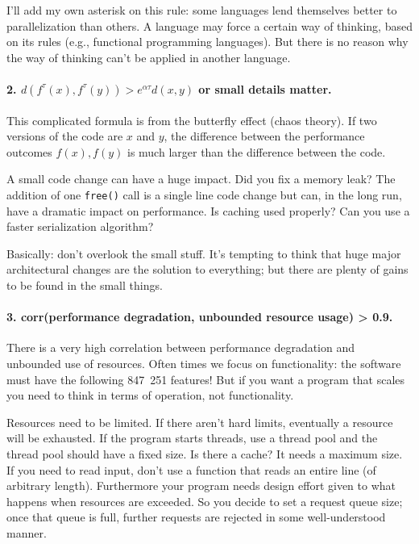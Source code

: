 I'll add my own asterisk on this rule: some languages lend themselves better to parallelization than others. A language may force a certain way of thinking, based on its rules (e.g., functional programming languages). But there is no reason why the way of thinking can't be applied in another language.


\paragraph{2. $d(f^{\tau}(x), f^{\tau}(y)) > e^{\alpha\tau} d(x, y)$ or small details matter.} This complicated formula is from the butterfly effect (chaos theory). If two versions of the code are $x$ and $y$, the difference between the performance outcomes $f(x), f(y)$ is much larger than the difference between the code.

A small code change can have a huge impact. Did you fix a memory leak? The addition of one \texttt{free()} call is a single line code change but can, in the long run, have a dramatic impact on performance. Is caching used properly? Can you use a faster serialization algorithm? 

Basically: don't overlook the small stuff. It's tempting to think that huge major architectural changes are the solution to everything; but there are plenty of gains to be found in the small things.

\paragraph{3. corr(performance degradation, unbounded resource usage) > 0.9.}
There is a very high correlation between performance degradation and unbounded use of resources. Often times we focus on functionality: the software must have the following 847~251 features! But if you want a program that scales you need to think in terms of operation, not functionality.

Resources need to be limited. If there aren't hard limits, eventually a resource will be exhausted. If the program starts threads, use a thread pool and the thread pool should have a fixed size. Is there a cache? It needs a maximum size. If you need to read input, don't use a function that reads an entire line (of arbitrary length). Furthermore your program needs design effort given to what happens when resources are exceeded. So you decide to set a request queue size; once that queue is full, further requests are rejected in some well-understood manner. 

